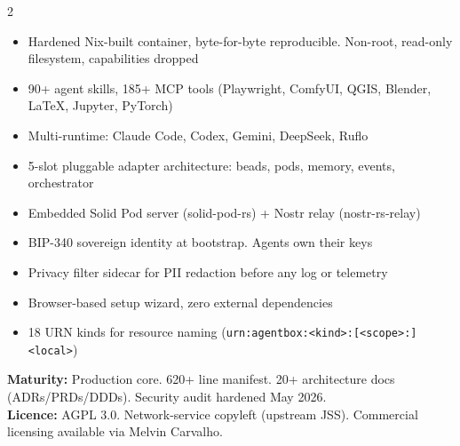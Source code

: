 \documentclass[10pt,a4paper]{article}
\begin{document}
\begin{multicols}{2}
{\color{purple}\faCogs}\;\\[2pt]
{\small
\begin{itemize}[leftmargin=8pt,itemsep=0pt,parsep=0pt,topsep=1pt,label={\color{purple}\textbullet}]
  \item Hardened Nix-built container, byte-for-byte reproducible. Non-root, read-only filesystem, capabilities dropped
  \item 90+ agent skills, 185+ MCP tools (Playwright, ComfyUI, QGIS, Blender, LaTeX, Jupyter, PyTorch)
  \item Multi-runtime: Claude Code, Codex, Gemini, DeepSeek, Ruflo
  \item 5-slot pluggable adapter architecture: beads, pods, memory, events, orchestrator
  \item Embedded Solid Pod server (solid-pod-rs) + Nostr relay (nostr-rs-relay)
  \item BIP-340 sovereign identity at bootstrap. Agents own their keys
  \item Privacy filter sidecar for PII redaction before any log or telemetry
  \item Browser-based setup wizard, zero external dependencies
  \item 18 URN kinds for resource naming (\texttt{urn:agentbox:<kind>:[<scope>:]<local>})
\end{itemize}
\textbf{Maturity:} Production core. 620+ line manifest. 20+ architecture docs (ADRs/PRDs/DDDs). Security audit hardened May 2026.\\
\textbf{Licence:} AGPL 3.0. Network-service copyleft (upstream JSS). Commercial licensing available via Melvin Carvalho.
}

\columnbreak


\end{multicols}
\end{document}
